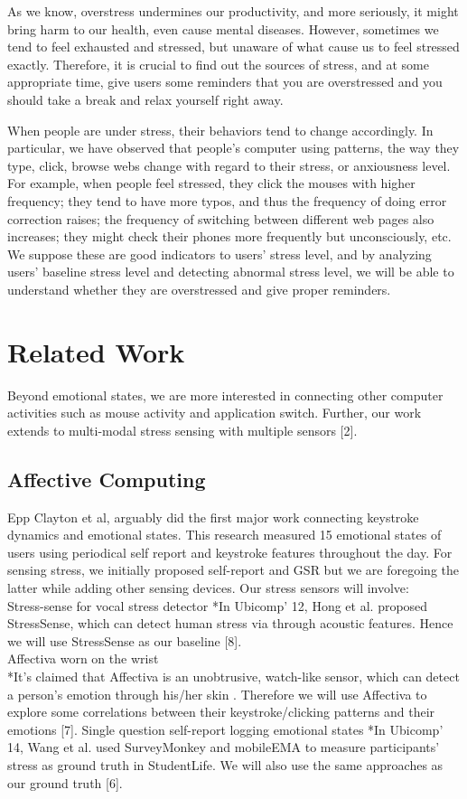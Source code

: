 \documentclass{article}
\begin{document}
As we know, overstress undermines our productivity, and more seriously, it might bring harm to our health, even cause mental diseases. However, sometimes we tend to feel exhausted and stressed, but unaware of what cause us to feel stressed exactly. Therefore, it is crucial to find out the sources of stress, and at some appropriate time, give  users some reminders that you are overstressed and you should take a break and relax yourself right away.

When people are under stress, their behaviors tend to change accordingly. In particular, we have observed that people’s computer using patterns, the way they type, click, browse webs change with regard to their stress, or anxiousness level. For example, when people feel stressed, they click the mouses with higher frequency; they tend to have more typos, and thus the frequency of doing error correction raises; the frequency of switching between different web pages also increases; they might check their phones more frequently but unconsciously, etc. We suppose these are good indicators to users’ stress level, and by analyzing users’ baseline stress level and detecting abnormal stress level, we will be able to understand whether they are overstressed and give proper reminders.

\section{Related Work}
Beyond emotional states, we are more interested in connecting other computer activities such as mouse activity and application switch. Further, our work extends to multi-modal stress sensing with multiple sensors [2].


\subsection{Affective Computing}
Epp Clayton et al, arguably did the first major work connecting keystroke dynamics and emotional states. This research measured 15 emotional states of users using periodical self report and keystroke features throughout the day. 
For sensing stress, we initially proposed self-report and GSR but we are foregoing the latter while adding other sensing devices. Our stress sensors will involve:\\
Stress-sense for vocal stress detector
*In Ubicomp’ 12, Hong et al. proposed StressSense, which can detect human stress via through acoustic features. Hence we will use StressSense as our baseline [8].\\
Affectiva worn on the wrist\\
*It’s claimed that Affectiva is an unobtrusive, watch-like sensor, which can detect a person’s emotion through his/her skin  . Therefore we will use Affectiva to explore some correlations between their keystroke/clicking patterns and their emotions [7].
Single question self-report logging emotional states
*In Ubicomp’ 14,  Wang et al. used SurveyMonkey and mobileEMA to measure participants’ stress as ground truth in StudentLife. We will also use the same approaches as our ground truth [6].
\end{document}
